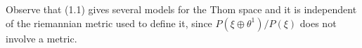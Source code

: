 Observe that (1.1) gives several models for the Thom space and it is independent of the riemannian metric used to define it, since $P(\xi \oplus \theta^1)/P(\xi)$ does not involve a metric.
